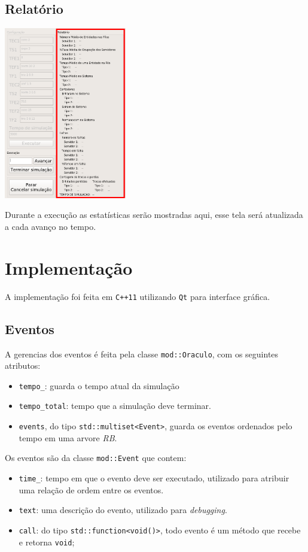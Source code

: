 \documentclass{article}
\begin{document}
\subsection{Relatório}
\begin{multicols}{2}
  \includegraphics[width=0.4\textwidth]{imgs/rel.png}
\columnbreak

Durante a execução as estatísticas serão mostradas aqui, esse tela será atualizada a cada 
avanço no tempo.

\end{multicols}

\section{Implementação}
A implementação foi feita em \texttt{C++11} utilizando \texttt{Qt} para interface gráfica.

\subsection{Eventos}
A gerencias dos eventos é feita pela classe \texttt{mod::Oraculo}, com os
seguintes atributos:

\begin{itemize}
  \item \texttt{tempo\_}: guarda o tempo atual da simulação
  \item \texttt{tempo\_total}: tempo que a simulação deve terminar.
  \item \texttt{events}, do tipo \texttt{std::multiset<Event>}, guarda os eventos
    ordenados pelo tempo em uma arvore \textit{RB}.
\end{itemize}

Os eventos são da classe \texttt{mod::Event} que contem:
\begin{itemize}
  \item \texttt{time\_}: tempo em que o evento deve ser executado, utilizado para atribuir 
    uma relação de ordem entre os eventos.
  \item \texttt{text}: uma descrição do evento, utilizado para \textit{debugging}.
  \item \texttt{call}: do tipo \texttt{std::function<void()>}, todo evento é um método 
    que recebe e retorna \texttt{void};
\end{itemize}
\end{document}
